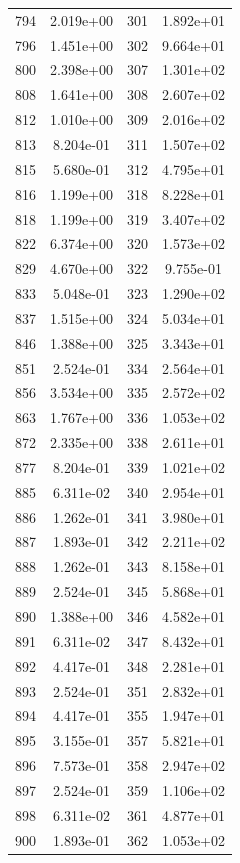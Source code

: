 \documentclass[12pt]{article}
\begin{document}
\begin{longtable}{@{}cccc@{}}
794 & 2.019e+00 & 301 & 1.892e+01 \\
796 & 1.451e+00 & 302 & 9.664e+01 \\
800 & 2.398e+00 & 307 & 1.301e+02 \\
808 & 1.641e+00 & 308 & 2.607e+02 \\
812 & 1.010e+00 & 309 & 2.016e+02 \\
813 & 8.204e-01 & 311 & 1.507e+02 \\
815 & 5.680e-01 & 312 & 4.795e+01 \\
816 & 1.199e+00 & 318 & 8.228e+01 \\
818 & 1.199e+00 & 319 & 3.407e+02 \\
822 & 6.374e+00 & 320 & 1.573e+02 \\
829 & 4.670e+00 & 322 & 9.755e-01 \\
833 & 5.048e-01 & 323 & 1.290e+02 \\
837 & 1.515e+00 & 324 & 5.034e+01 \\
846 & 1.388e+00 & 325 & 3.343e+01 \\
851 & 2.524e-01 & 334 & 2.564e+01 \\
856 & 3.534e+00 & 335 & 2.572e+02 \\
863 & 1.767e+00 & 336 & 1.053e+02 \\
872 & 2.335e+00 & 338 & 2.611e+01 \\
877 & 8.204e-01 & 339 & 1.021e+02 \\
885 & 6.311e-02 & 340 & 2.954e+01 \\
886 & 1.262e-01 & 341 & 3.980e+01 \\
887 & 1.893e-01 & 342 & 2.211e+02 \\
888 & 1.262e-01 & 343 & 8.158e+01 \\
889 & 2.524e-01 & 345 & 5.868e+01 \\
890 & 1.388e+00 & 346 & 4.582e+01 \\
891 & 6.311e-02 & 347 & 8.432e+01 \\
892 & 4.417e-01 & 348 & 2.281e+01 \\
893 & 2.524e-01 & 351 & 2.832e+01 \\
894 & 4.417e-01 & 355 & 1.947e+01 \\
895 & 3.155e-01 & 357 & 5.821e+01 \\
896 & 7.573e-01 & 358 & 2.947e+02 \\
897 & 2.524e-01 & 359 & 1.106e+02 \\
898 & 6.311e-02 & 361 & 4.877e+01 \\
900 & 1.893e-01 & 362 & 1.053e+02 \\

\end{longtable}
\end{document}
